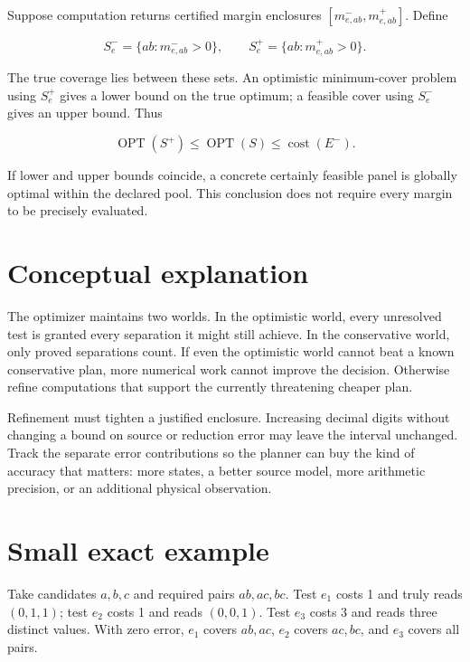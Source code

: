 \documentclass[
  11pt,
  a4paper,
]{report}
\begin{document}
Suppose computation returns certified margin enclosures
\([m^-_{e,ab},m^+_{e,ab}]\). Define

\[
S_e^- =\{ab:m^-_{e,ab}>0\},\qquad
S_e^+ =\{ab:m^+_{e,ab}>0\}.
\]

The true coverage lies between these sets. An optimistic minimum-cover
problem using \(S_e^+\) gives a lower bound on the true optimum; a
feasible cover using \(S_e^-\) gives an upper bound. Thus

\[
\operatorname{OPT}(S^+)\le\operatorname{OPT}(S)\le
\operatorname{cost}(E^-).
\]

If lower and upper bounds coincide, a concrete certainly feasible panel
is globally optimal within the declared pool. This conclusion does not
require every margin to be precisely evaluated.

\hypertarget{conceptual-explanation}{%
\section{Conceptual explanation}\label{conceptual-explanation}}

The optimizer maintains two worlds. In the optimistic world, every
unresolved test is granted every separation it might still achieve. In
the conservative world, only proved separations count. If even the
optimistic world cannot beat a known conservative plan, more numerical
work cannot improve the decision. Otherwise refine computations that
support the currently threatening cheaper plan.

Refinement must tighten a justified enclosure. Increasing decimal digits
without changing a bound on source or reduction error may leave the
interval unchanged. Track the separate error contributions so the
planner can buy the kind of accuracy that matters: more states, a better
source model, more arithmetic precision, or an additional physical
observation.

\hypertarget{small-exact-example}{%
\section{Small exact example}\label{small-exact-example}}

Take candidates \(a,b,c\) and required pairs \(ab,ac,bc\). Test \(e_1\)
costs 1 and truly reads \((0,1,1)\); test \(e_2\) costs 1 and reads
\((0,0,1)\). Test \(e_3\) costs 3 and reads three distinct values. With
zero error, \(e_1\) covers \(ab,ac\), \(e_2\) covers \(ac,bc\), and
\(e_3\) covers all pairs.
\end{document}
